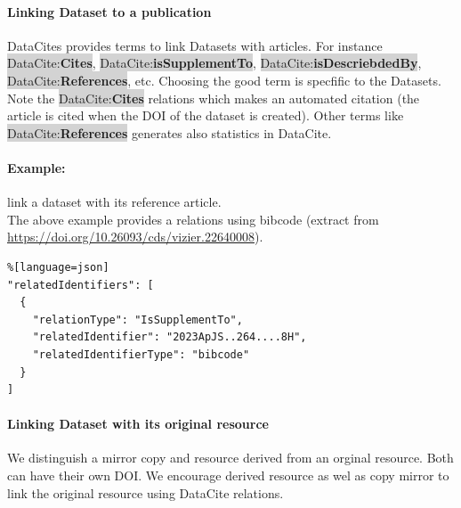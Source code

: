 \documentclass[11pt,a4paper]{ivoa}
\newcommand{\dataciteterm}[1]{\colorbox{lightgray}{DataCite:\textbf{#1}}}
\begin{document}

\paragraph{Linking Dataset to a publication}
DataCites provides terms to link Datasets with articles. For instance \dataciteterm{Cites}, \dataciteterm{isSupplementTo}, \dataciteterm{isDescriebdedBy}, \dataciteterm{References}, etc.
Choosing the good term is specfific to the Datasets. \\


Note the \dataciteterm{Cites} relations which makes an automated citation (the article is cited when the DOI of the dataset is created). 
Other terms like \dataciteterm{References} generates also statistics in DataCite.





\paragraph{Example:} link a dataset with its reference article.\\
The above example provides a relations using bibcode (extract from \url{https://doi.org/10.26093/cds/vizier.22640008}).

\begin{lstlisting}%[language=json]
"relatedIdentifiers": [
  {
    "relationType": "IsSupplementTo",
    "relatedIdentifier": "2023ApJS..264....8H",
    "relatedIdentifierType": "bibcode"
  }
]
\end{lstlisting}

\paragraph{Linking Dataset with its original resource}
We distinguish a mirror copy and resource derived from an orginal resource.
Both can have their own DOI. We encourage derived resource as wel as copy mirror to link the original resource using DataCite relations.
\end{document}
